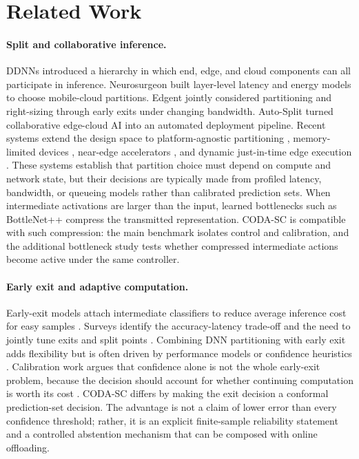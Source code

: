 \documentclass[11pt]{article}
\begin{document}
\section{Related Work}

\paragraph{Split and collaborative inference.}
DDNNs \citep{teerapittayanon2017ddnn} introduced a hierarchy in which end,
edge, and cloud components can all participate in inference. Neurosurgeon
\citep{kang2017neurosurgeon} built layer-level latency and energy models to
choose mobile-cloud partitions. Edgent \citep{li2019edgent} jointly considered
partitioning and right-sizing through early exits under changing bandwidth.
Auto-Split \citep{banitalebi2021autosplit} turned collaborative edge-cloud AI
into an automated deployment pipeline. Recent systems extend the design space to
platform-agnostic partitioning \citep{partnner2024}, memory-limited devices
\citep{li2024flexnn}, near-edge accelerators \citep{liu2024near}, and dynamic
just-in-time edge execution \citep{inferedge2025}. These systems establish that
partition choice must depend on compute and network state, but their decisions
are typically made from profiled latency, bandwidth, or queueing models rather
than calibrated prediction sets. When intermediate activations are larger than
the input, learned bottlenecks such as BottleNet++ \citep{shao2020bottlenet}
compress the transmitted representation. CODA-SC is compatible with such
compression: the main benchmark isolates control and calibration, and the
additional bottleneck study tests whether compressed intermediate actions become
active under the same controller.

\paragraph{Early exit and adaptive computation.}
Early-exit models attach intermediate classifiers to reduce average inference
cost for easy samples \citep{teerapittayanon2016branchynet}. Surveys identify the
accuracy-latency trade-off and the need to jointly tune exits and split points
\citep{matsubara2022split}. Combining DNN partitioning with early exit adds
flexibility but is often driven by performance models or confidence heuristics
\citep{veith2022combining}. Calibration work argues that confidence alone is not
the whole early-exit problem, because the decision should account for whether
continuing computation is worth its cost \citep{kubaty2025rethinking}. CODA-SC
differs by making the exit decision a conformal prediction-set decision. The
advantage is not a claim of lower error than every confidence threshold; rather,
it is an explicit finite-sample reliability statement and a
controlled abstention mechanism that can be composed with online offloading.
\end{document}
